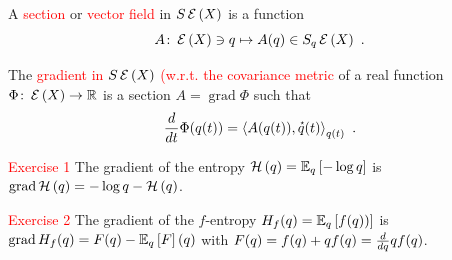 \documentclass[xcolor=svgnames]{beamer}
\DeclareMathOperator{\grad}{grad}
\newcommand{\rosso}[1]{\textcolor{red}{#1}}
\renewcommand{\emph}{\rosso}
\begin{document}
\begin{frame}
\begin{block}{}
A \emph{section} or \emph{vector field} in $\expbundleat X$ is a function
\begin{equation*}
    A \colon \maxexpat X \ni q \mapsto A(q) \in \expfiberat q X \ .
\end{equation*}

The \emph{gradient in $\expbundleat X$ (w.r.t. the covariance metric} of a real function $\Phi \colon \maxexpat X \to \reals$ is a section $A = \grad \Phi$ such that 
\begin{equation*}
\derivby t \Phi(q(t)) = \scalarat {q(t)} {A(q(t))}{\velocity q(t)} \ .
\end{equation*}
\end{block}

\emph{Exercise 1} The gradient of the entropy $\entropyof q = \expectat q {- \log q}$ is
$\grad \entropyof q = -\log q - \entropyof q$.

\emph{Exercise 2} The gradient of the $f$-entropy $H_f(q) = \expectat q {f(q))}$ is $\grad H_f(q) = F(q) - \expectat q F(q)$ with $F(q) = f(q) + q f(q) = \derivby q q f(q)$. 
\end{frame}
\end{document}
